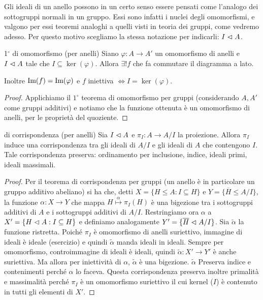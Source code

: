 Gli ideali di un anello possono in un certo senso essere pensati come l'analogo dei sottogruppi normali in un gruppo. Essi sono infatti i nuclei degli omomorfismi, e valgono per essi teoremi analoghi a quelli visti in teoria dei gruppi, come vedremo adesso. Per questo motivo scegliamo la stessa notazione per indicarli: $I \vartriangleleft A$.

\vspace{0.5cm}

\begin{minipage}{0.7\textwidth}
\begin{theorem}{1$^{\circ}$ di omomorfismo (per anelli)}
    Siano $\varphi : A \rightarrow A'$ un omomorfismo di anelli e $I \vartriangleleft A$ tale che $I \subseteq \ker(\varphi)$. Allora $\exists ! f$ che fa commutare il diagramma a lato.
    
    Inoltre $\text{Im}(f) = \text{Im}(\varphi)$ e $f$ iniettiva $\iff I = \ker(\varphi)$.
\end{theorem}
\end{minipage}
\hfill
\begin{minipage}{0.2\textwidth}  
\end{minipage}
\begin{proof}
    Applichiamo il $1^{\circ}$ teorema di omomorfismo per gruppi (considerando $A, A'$ come gruppi additivi) e notiamo che la funzione ottenuta è un omomorfismo di anelli, per le proprietà del quoziente.
\end{proof}
\begin{theorem}{di corrispondenza (per anelli)}
    Sia $I \vartriangleleft A$ e $\pi_I: A \rightarrow A/I$ la proiezione. Allora $\pi_I$ induce una corrispondenza tra gli ideali di $A/I$ e gli ideali di $A$ che contengono $I$. Tale corrispondenza preserva: ordinamento per inclusione, indice, ideali primi, ideali massimali. 
\end{theorem}\begin{proof}
    Per il teorema di corrispondenza per gruppi (un anello è in particolare un gruppo additivo abeliano) si ha che, detti $X = \{ H \leq A : I \subseteq H\}$ e $Y = \{ \overline{H} \leq A/I\}$, la funzione $\alpha: X \rightarrow Y$ che mappa $H \overset{\alpha}{\mapsto} \pi_I(H)$ è una bigezione tra i sottogruppi additivi di $A$ e i sottogruppi additivi di $A/I$. Restringiamo ora $\alpha$ a $X' = \{ H \vartriangleleft A : I \subseteq H\}$ e definiamo analogamente $Y' = \{ \overline{H} \vartriangleleft A/I \}$. Sia $\tilde \alpha$ la funzione ristretta. Poiché $\pi_I$ è omomorfismo di anelli suriettivo, immagine di ideali è ideale (esercizio) e quindi $\tilde \alpha$ manda ideali in ideali. Sempre per omomorfismo, controimmagine di ideali è ideali, quindi $\tilde \alpha : X' \rightarrow Y'$ è anche suriettiva. Ma allora per iniettività di $\alpha$, $\tilde \alpha$ è una bigezione. $\tilde \alpha$ Preserva indice e contenimenti perché $\alpha$ lo faceva. Questa corrispondenza preserva inoltre primalità e massimalità perché $\pi_I$ è un omomorfismo suriettivo il cui kernel ($I$) è contenuto in tutti gli elementi di $X'$.
\end{proof}
